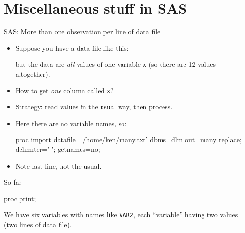 \documentclass[unknownkeysallowed]{beamer}\usepackage[]{graphicx}\usepackage[]{color}
\begin{document}


\section{Miscellaneous stuff in SAS}

\frame{\sectionpage}





\begin{frame}[fragile]{SAS: More than one observation per line of data file}
  
  \begin{itemize}
  \item Suppose you have a data file like this:
    


but the data are \emph{all} values of one variable \texttt{x} (so
there are 12 values altogether).
\item How to get \emph{one} column called \texttt{x}?
\item Strategy: read values in the usual way, then process.
\item Here there are no variable names, so:

  \begin{footnotesize}
  \begin{Datastep}
proc import
  datafile='/home/ken/many.txt'
    dbms=dlm out=many replace;
  delimiter=' ';
  getnames=no;
  \end{Datastep}
    
  \end{footnotesize}

\item Note last line, not the usual.

  \end{itemize}
  
\end{frame}

\begin{frame}[fragile]{So far}
  
  \begin{Sascode}[store=ma]
proc print;    
  \end{Sascode}
  

We have six variables with names like \texttt{VAR2}, each ``variable''
having two values (two lines of data file).

  
\end{frame}
\end{document}
